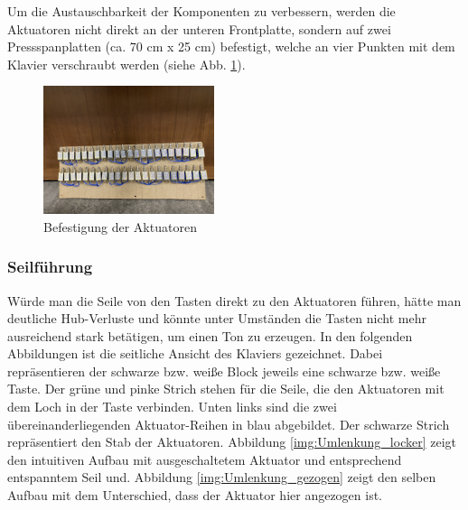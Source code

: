 Um die Austauschbarkeit der Komponenten zu verbessern, werden die Aktuatoren nicht direkt an der unteren Frontplatte,
sondern auf zwei Pressspanplatten (ca. 70 cm x 25 cm) befestigt, welche an vier Punkten mit dem Klavier verschraubt werden (siehe Abb. \ref{fig:BefestigungHubmagnete}). %

\begin{figure}[htbp]
	\centering
	\includegraphics[width=5cm]{img/Magnetbrett.jpg}
	\caption{Befestigung der Aktuatoren}
	\label{fig:BefestigungHubmagnete}
\end{figure}

\subsubsection{Seilführung}

Würde man die Seile von den Tasten direkt zu den Aktuatoren führen,
hätte man deutliche Hub-Verluste und könnte unter Umständen die Tasten nicht mehr ausreichend stark betätigen, um einen Ton zu erzeugen.
\newline
In den folgenden Abbildungen ist die seitliche Ansicht des Klaviers gezeichnet.
Dabei repräsentieren der schwarze bzw. weiße Block jeweils eine schwarze bzw. weiße Taste.
Der grüne und pinke Strich stehen für die Seile, die den Aktuatoren mit dem Loch in der Taste verbinden.
Unten links sind die zwei übereinanderliegenden Aktuator-Reihen in blau abgebildet.
Der schwarze Strich repräsentiert den Stab der Aktuatoren. %
\newline
Abbildung \ref{img:Umlenkung_locker} zeigt den intuitiven Aufbau mit ausgeschaltetem Aktuator und entsprechend entspanntem Seil und.
Abbildung \ref{img:Umlenkung_gezogen} zeigt den selben Aufbau mit dem Unterschied, dass der Aktuator hier angezogen ist.

